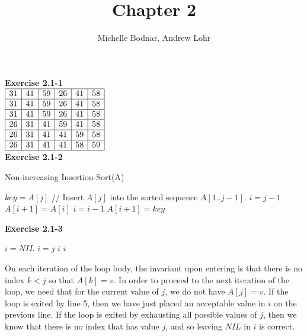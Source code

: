 \documentclass{article}
\title{Chapter 2}
\author{Michelle Bodnar, Andrew Lohr}
\begin{document}
\maketitle

\noindent\textbf{ Exercise 2.1-1} \\

$
\begin{array}{|c|c|c|c|c|c|}
\hline
31&41&59&26&41&58\\
\hline
31&41&59&26&41&58\\
\hline
31&41&59&26&41&58\\
\hline
26&31&41&59&41&58\\
\hline
26&31&41&41&59&58\\
\hline
26&31&41&41&58&59\\
\hline
\end{array}
$ \\

\noindent\textbf{ Exercise 2.1-2}\\

\begin{algorithm}
\caption{Non-increasing Insertion-Sort(A)}
\begin{algorithmic}[1]
	\State $key = A[j]$
	\State // Insert $A[j]$ into the sorted sequence $A[1..j-1]$.
	\State $i=j-1$
		\State $A[i+1] = A[i]$
		\State $i=i-1$
	\EndWhile
\EndFor
\State $A[i+1] = key$
\end{algorithmic}
\end{algorithm}


\noindent\textbf{ Exercise 2.1-3}\\

\begin{algorithm} \begin{algorithmic}[1]
 \State $i=NIL$
 \State $i = j$
 \State \Return $i$
 \EndIf 
\State \Return $i$
 \EndFor
 \end{algorithmic}
\end{algorithm}
On each iteration of the loop body, the invariant upon entering is that there is no index $k<j$ so that $A[k]=v$. In order to proceed to the next iteration of the loop, we need that for the current value of $j$, we do not have $A[j] =v$. If the loop is exited by line 5, then we have just placed an acceptable value in $i$ on the previous line. If the loop is exited by exhausting all possible values of $j$, then we know that there is no index that has value $j$, and so leaving $NIL$ in $i$ is correct. \\
\end{document}
